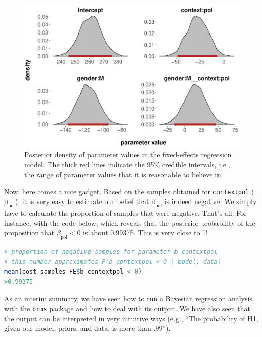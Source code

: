 \documentclass[nobib]{tufte-handout}
\begin{document}
\begin{figure}
  \centering
  \includegraphics[width=\textwidth]{pics/posterior_density_FE.pdf}
  \caption[Posterior over coefficients in fixed-effects model]{Posterior density of parameter
    values in the fixed-effects regression model. The thick red lines indicate the 95\%
    credible intervals, i.e., the range of parameter values that it is reasonable to believe
    in.}
  \label{fig:Posteriors_FE}
\end{figure}

Now, here comes a nice gadget. Based on the samples obtained for \texttt{contextpol} ($\beta_{\text{pol}}$), it is very easy to estimate our belief that $\beta_{\text{pol}}$ is indeed negative. We simply have to calculate the proportion of samples that were negative. That's all. For instance, with the code below, which reveals that the posterior probability of the proposition that $\beta_{\text{pol}} < 0$ is about 0.99375. This is very close to 1!  

\bigskip

\begin{minipage}[]{\textwidth}
\begin{lstlisting}[language=R]
# proportion of negative samples for parameter b_contextpol
# this number approximates P(b_contextpol < 0 | model, data)
mean(post_samples_FE$b_contextpol < 0) 
>0.99375
\end{lstlisting}
\end{minipage}

As an interim summary, we have seen how to run a Bayesian regression analysis with the
\texttt{brms} package and how to deal with its output. We have also seen that the output can be interpreted in very intuitive ways (e.g., ``The probability of H1, given our model, priors, and data, is more than .99'').
\end{document}
